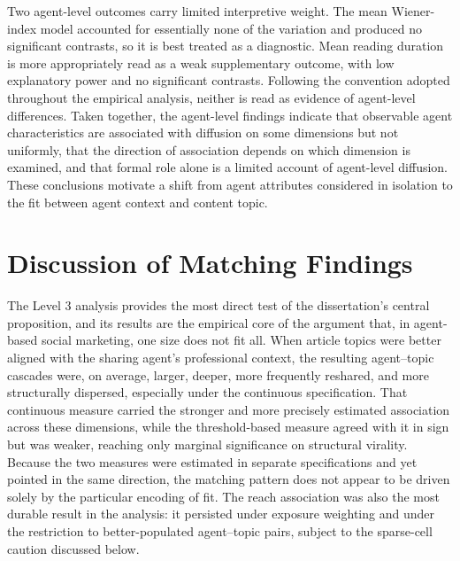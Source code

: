 Two agent-level outcomes carry limited interpretive weight. The mean Wiener-index model accounted for essentially none of the variation and produced no significant contrasts, so it is best treated as a diagnostic. Mean reading duration is more appropriately read as a weak supplementary outcome, with low explanatory power and no significant contrasts. Following the convention adopted throughout the empirical analysis, neither is read as evidence of agent-level differences. Taken together, the agent-level findings indicate that observable agent characteristics are associated with diffusion on some dimensions but not uniformly, that the direction of association depends on which dimension is examined, and that formal role alone is a limited account of agent-level diffusion. These conclusions motivate a shift from agent attributes considered in isolation to the fit between agent context and content topic.

\section{Discussion of Matching Findings}
\label{sec:7-3-discussion-of-matching-findings}

The Level 3 analysis provides the most direct test of the dissertation's central proposition, and its results are the empirical core of the argument that, in agent-based social marketing, one size does not fit all. When article topics were better aligned with the sharing agent's professional context, the resulting agent–topic cascades were, on average, larger, deeper, more frequently reshared, and more structurally dispersed, especially under the continuous  specification. That continuous measure carried the stronger and more precisely estimated association across these dimensions, while the threshold-based  measure agreed with it in sign but was weaker, reaching only marginal significance on structural virality. Because the two measures were estimated in separate specifications and yet pointed in the same direction, the matching pattern does not appear to be driven solely by the particular encoding of fit. The reach association was also the most durable result in the analysis: it persisted under exposure weighting and under the restriction to better-populated agent–topic pairs, subject to the sparse-cell caution discussed below.

